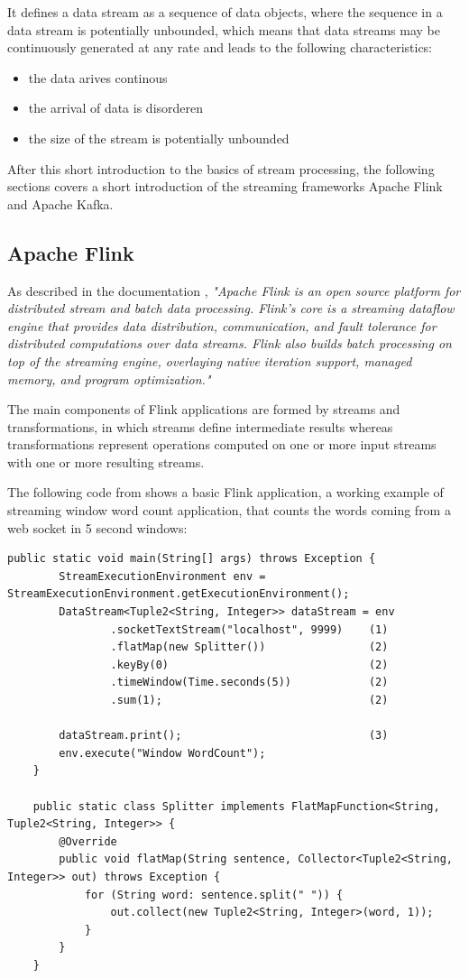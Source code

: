 It defines a data stream as a sequence of data objects, where the sequence in a data stream
is potentially unbounded, which means that data streams may be continuously generated
at any rate \cite{Nam15} and leads to the following characteristics:
\begin{itemize}
	\item the data arives continous
	\item the arrival of data is disorderen
	\item the size of the stream is potentially unbounded
\end{itemize}

After this short introduction to the basics of stream processing, the following sections
covers a short introduction of the streaming frameworks Apache Flink and Apache Kafka.
\subsection{Apache Flink}

As described in the documentation \cite{Flink16}, \textit{"Apache Flink is an open source platform for
distributed stream and batch data processing. Flink’s core is a streaming dataflow engine that
provides data distribution, communication, and fault tolerance for distributed computations over
data streams. Flink also builds batch processing on top of the streaming engine, overlaying native
iteration support, managed memory, and program optimization."}

The main components of Flink applications are formed by streams and transformations, in which
streams define intermediate results whereas transformations represent operations computed on one
or more input streams with one or more resulting streams.

The following code from \cite{Flink16} shows a basic Flink application, a working example of streaming
window word count application, that counts the words coming from a web socket in 5 second windows:


\begin{lstlisting}[caption={Basic Apache Flink streaming application}, captionpos=b, label={lst:basicflink}]
public static void main(String[] args) throws Exception {
        StreamExecutionEnvironment env = StreamExecutionEnvironment.getExecutionEnvironment();
        DataStream<Tuple2<String, Integer>> dataStream = env
                .socketTextStream("localhost", 9999)    (1)
                .flatMap(new Splitter())                (2)
                .keyBy(0)                               (2)
                .timeWindow(Time.seconds(5))            (2)
                .sum(1);                                (2)

        dataStream.print();                             (3)
        env.execute("Window WordCount");
    }

    public static class Splitter implements FlatMapFunction<String, Tuple2<String, Integer>> {
        @Override
        public void flatMap(String sentence, Collector<Tuple2<String, Integer>> out) throws Exception {
            for (String word: sentence.split(" ")) {
                out.collect(new Tuple2<String, Integer>(word, 1));
            }
        }
    }
\end{lstlisting}

